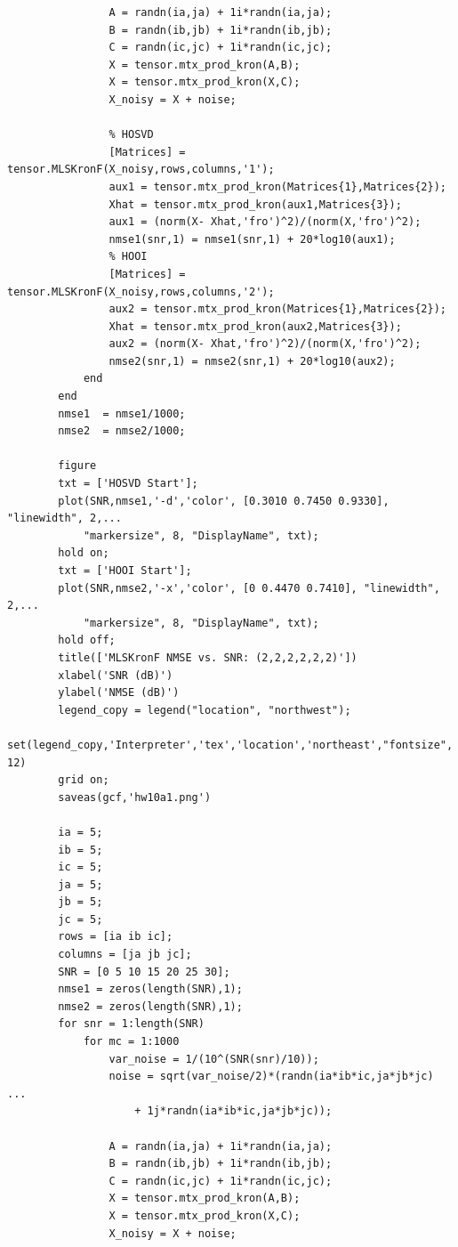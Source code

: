 \documentclass[a4paper,10pt]{article}
\begin{document}
\begin{verbatim}
                A = randn(ia,ja) + 1i*randn(ia,ja);
                B = randn(ib,jb) + 1i*randn(ib,jb);
                C = randn(ic,jc) + 1i*randn(ic,jc);
                X = tensor.mtx_prod_kron(A,B);
                X = tensor.mtx_prod_kron(X,C);
                X_noisy = X + noise;
                
                % HOSVD
                [Matrices] = tensor.MLSKronF(X_noisy,rows,columns,'1');
                aux1 = tensor.mtx_prod_kron(Matrices{1},Matrices{2});
                Xhat = tensor.mtx_prod_kron(aux1,Matrices{3});
                aux1 = (norm(X- Xhat,'fro')^2)/(norm(X,'fro')^2);
                nmse1(snr,1) = nmse1(snr,1) + 20*log10(aux1);
                % HOOI
                [Matrices] = tensor.MLSKronF(X_noisy,rows,columns,'2');
                aux2 = tensor.mtx_prod_kron(Matrices{1},Matrices{2});
                Xhat = tensor.mtx_prod_kron(aux2,Matrices{3});
                aux2 = (norm(X- Xhat,'fro')^2)/(norm(X,'fro')^2);
                nmse2(snr,1) = nmse2(snr,1) + 20*log10(aux2);
            end
        end
        nmse1  = nmse1/1000;
        nmse2  = nmse2/1000;

        figure
        txt = ['HOSVD Start'];
        plot(SNR,nmse1,'-d','color', [0.3010 0.7450 0.9330], "linewidth", 2,...
            "markersize", 8, "DisplayName", txt);
        hold on;
        txt = ['HOOI Start'];
        plot(SNR,nmse2,'-x','color', [0 0.4470 0.7410], "linewidth", 2,...
            "markersize", 8, "DisplayName", txt);
        hold off;
        title(['MLSKronF NMSE vs. SNR: (2,2,2,2,2,2)'])
        xlabel('SNR (dB)')
        ylabel('NMSE (dB)')
        legend_copy = legend("location", "northwest");
        set(legend_copy,'Interpreter','tex','location','northeast',"fontsize", 12)
        grid on;
        saveas(gcf,'hw10a1.png')

        ia = 5;
        ib = 5;
        ic = 5;
        ja = 5;
        jb = 5;
        jc = 5;
        rows = [ia ib ic];
        columns = [ja jb jc];
        SNR = [0 5 10 15 20 25 30];
        nmse1 = zeros(length(SNR),1);
        nmse2 = zeros(length(SNR),1);
        for snr = 1:length(SNR)
            for mc = 1:1000
                var_noise = 1/(10^(SNR(snr)/10));
                noise = sqrt(var_noise/2)*(randn(ia*ib*ic,ja*jb*jc) ...
                    + 1j*randn(ia*ib*ic,ja*jb*jc));
                
                A = randn(ia,ja) + 1i*randn(ia,ja);
                B = randn(ib,jb) + 1i*randn(ib,jb);
                C = randn(ic,jc) + 1i*randn(ic,jc);
                X = tensor.mtx_prod_kron(A,B);
                X = tensor.mtx_prod_kron(X,C);
                X_noisy = X + noise;
                

\end{verbatim}
\end{document}
